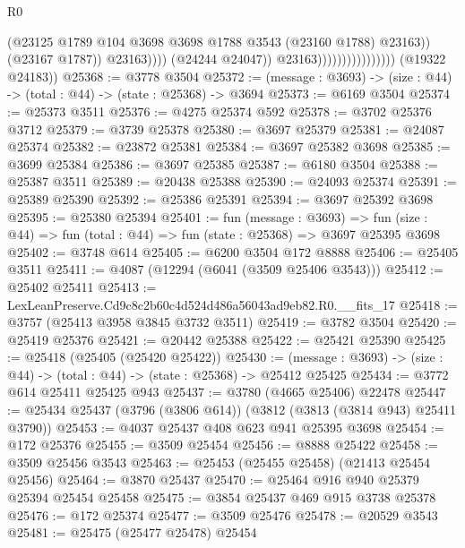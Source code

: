 \begin{lexlean}{R0}
\begin{coremodule}
                                                    (@23125
                                                      @1789
                                                      @104
                                                      @3698
                                                      @3698
                                                      @1788
                                                      @3543
                                                      (@23160 @1788)
                                                      @23163))
                                                  (@23167 @1787))
                                                @23163))))
                                        (@24244 @24047))
                                      @23163))))))))))))))))
      (@19322 @24183))
@25368 := @3778 @3504
@25372 := (message : @3693) -> (size : @44) -> (total : @44) -> (state : @25368) -> @3694
@25373 := @6169 @3504
@25374 := @25373 @3511
@25376 := @4275 @25374 @592
@25378 := @3702 @25376 @3712
@25379 := @3739 @25378
@25380 := @3697 @25379
@25381 := @24087 @25374
@25382 := @23872 @25381
@25384 := @3697 @25382 @3698
@25385 := @3699 @25384
@25386 := @3697 @25385
@25387 := @6180 @3504
@25388 := @25387 @3511
@25389 := @20438 @25388
@25390 := @24093 @25374
@25391 := @25389 @25390
@25392 := @25386 @25391
@25394 := @3697 @25392 @3698
@25395 := @25380 @25394
@25401 := fun (message : @3693) =>
  fun (size : @44) => fun (total : @44) => fun (state : @25368) => @3697 @25395 @3698
@25402 := @3748 @614
@25405 := @6200 @3504 @172 @8888
@25406 := @25405 @3511
@25411 := @4087 (@12294 (@6041 (@3509 @25406 @3543)))
@25412 := @25402 @25411
@25413 := LexLeanPreserve.Cd9c8c2b60c4d524d486a56043ad9eb82.R0.__fits_17
@25418 := @3757 (@25413 @3958 @3845 @3732 @3511)
@25419 := @3782 @3504
@25420 := @25419 @25376
@25421 := @20442 @25388
@25422 := @25421 @25390
@25425 := @25418 (@25405 (@25420 @25422))
@25430 := (message : @3693) -> (size : @44) -> (total : @44) -> (state : @25368) -> @25412 @25425
@25434 := @3772 @614 @25411 @25425 @943
@25437 := @3780 (@4665 @25406) @22478
@25447 := @25434 @25437 (@3796 (@3806 @614)) (@3812 (@3813 (@3814 @943) @25411 @3790))
@25453 := @4037 @25437 @408 @623 @941 @25395 @3698
@25454 := @172 @25376
@25455 := @3509 @25454
@25456 := @8888 @25422
@25458 := @3509 @25456 @3543
@25463 := @25453 (@25455 @25458) (@21413 @25454 @25456)
@25464 := @3870 @25437
@25470 := @25464 @916 @940 @25379 @25394 @25454 @25458
@25475 := @3854 @25437 @469 @915 @3738 @25378
@25476 := @172 @25374
@25477 := @3509 @25476
@25478 := @20529 @3543
@25481 := @25475 (@25477 @25478) @25454

\end{coremodule}
\end{lexlean}
